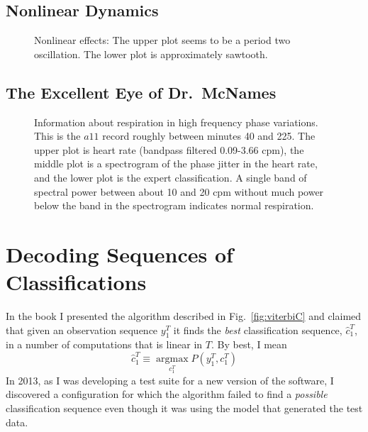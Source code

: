 \documentclass[prelim,showlabels]{book}
\newcommand{\argmax}{\operatorname*{argmax}}
\begin{document}
\addtocounter{subsection}{1}
\subsection{Nonlinear Dynamics}
\label{sec:NLD}

\begin{figure}
  \caption[Nonlinear effects]%
  {Nonlinear effects: The upper plot seems to be a period two
    oscillation.  The lower plot is approximately sawtooth.}
  \label{fig:ApneaNLD}
\end{figure}

\subsection{The Excellent Eye of Dr.\ McNames}
\label{sec:mcnames}

\begin{figure}
  \caption[Information about respiration in high
  frequency phase variations]%
  {Information about respiration in high frequency phase variations.
    This is the $a11$ record roughly between minutes 40 and 225.  The
    upper plot is heart rate (bandpass filtered 0.09-3.66 cpm), the
    middle plot is a spectrogram of the phase jitter in the heart
    rate, and the lower plot is the expert classification.  A single
    band of spectral power between about 10 and 20 cpm without much
    power below the band in the spectrogram indicates normal
    respiration.}
  \label{fig:sgram}
\end{figure}
\afterpage{\clearpage} %
\newpage
\section{Decoding Sequences of Classifications}
\label{sec:V4Class}

In the book I presented the algorithm described
in Fig.~\ref{fig:viterbiC} and claimed that given an observation sequence
$y_1^T$ it finds the \emph{best} classification sequence, $\hat c_1^T$,
in a number of computations that is linear in $T$.  By best, I mean
\begin{equation*}
  \hat c_1^T \equiv \argmax_{c_1^T} P(y_1^T,c_1^T)
\end{equation*}
In 2013, as I was developing a test suite for a new version of the
software, I discovered a configuration for which the algorithm failed
to find a \emph{possible} classification sequence even though it was
using the model that generated the test data.
\end{document}

